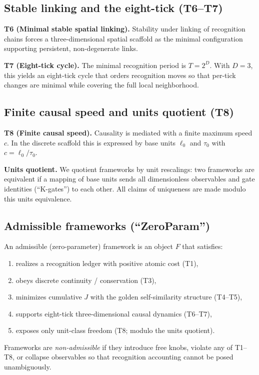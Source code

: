 \documentclass[11pt]{article}
\begin{document}
\subsection{Stable linking and the eight\mbox{-}tick (T6--T7)}
\textbf{T6 (Minimal stable spatial linking).} Stability under linking of recognition chains forces a three\mbox{-}dimensional spatial scaffold as the minimal configuration supporting persistent, non\mbox{-}degenerate links.

\textbf{T7 (Eight\mbox{-}tick cycle).} The minimal recognition period is \(T=2^D\). With \(D=3\), this yields an eight\mbox{-}tick cycle that orders recognition moves so that per\mbox{-}tick changes are minimal while covering the full local neighborhood.

\subsection{Finite causal speed and units quotient (T8)}
\textbf{T8 (Finite causal speed).} Causality is mediated with a finite maximum speed \(c\). In the discrete scaffold this is expressed by base units \(\ell_0\) and \(\tau_0\) with \(c=\ell_0/\tau_0\).

\textbf{Units quotient.} We quotient frameworks by unit rescalings: two frameworks are equivalent if a mapping of base units sends all dimensionless observables and gate identities (``K\mbox{-}gates'') to each other. All claims of uniqueness are made modulo this units equivalence.

\subsection{Admissible frameworks (``ZeroParam'')}
An admissible (zero\mbox{-}parameter) framework is an object \(F\) that satisfies:
\begin{enumerate}
  \item realizes a recognition ledger with positive atomic cost (T1),
  \item obeys discrete continuity / conservation (T3),
  \item minimizes cumulative \(J\) with the golden self\mbox{-}similarity structure (T4--T5),
  \item supports eight\mbox{-}tick three\mbox{-}dimensional causal dynamics (T6--T7),
  \item exposes only unit\mbox{-}class freedom (T8; modulo the units quotient).
\end{enumerate}
Frameworks are \emph{non\mbox{-}admissible} if they introduce free knobs, violate any of T1--T8, or collapse observables so that recognition accounting cannot be posed unambiguously.
\end{document}
